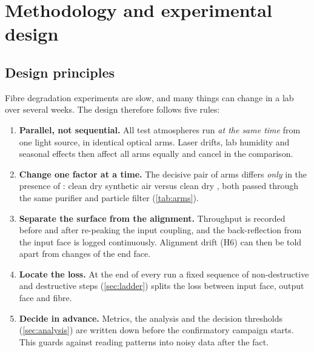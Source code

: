\section{Methodology and experimental design}\label{sec:methods}

\subsection{Design principles}
Fibre degradation experiments are slow, and many things can change in a lab over several weeks. The design
therefore follows five rules:
\begin{enumerate}[label=\textbf{P\arabic*}]
  \item \textbf{Parallel, not sequential.} All test atmospheres run \emph{at the same time} from
        one light source, in identical optical arms. Laser drifts, lab humidity and seasonal
        effects then affect all arms equally and cancel in the comparison.
  \item \textbf{Change one factor at a time.} The decisive pair of arms differs \emph{only} in
        the presence of \Oxy{}: clean dry synthetic air versus clean dry \Ntwo{}, both passed through the
        same purifier and particle filter (\cref{tab:arms}).
  \item \textbf{Separate the surface from the alignment.} Throughput is recorded before and after
        re-peaking the input coupling, and the back-reflection from the input face is logged
        continuously. Alignment drift (H6) can then be told apart from changes of the end face.
  \item \textbf{Locate the loss.} At the end of every run a fixed sequence of non-destructive
        and destructive steps (\cref{sec:ladder}) splits the loss between input face, output face
        and fibre.
  \item \textbf{Decide in advance.} Metrics, the analysis and the decision thresholds
        (\cref{sec:analysis}) are written down before the confirmatory campaign starts. This
        guards against reading patterns into noisy data after the fact.
\end{enumerate}

